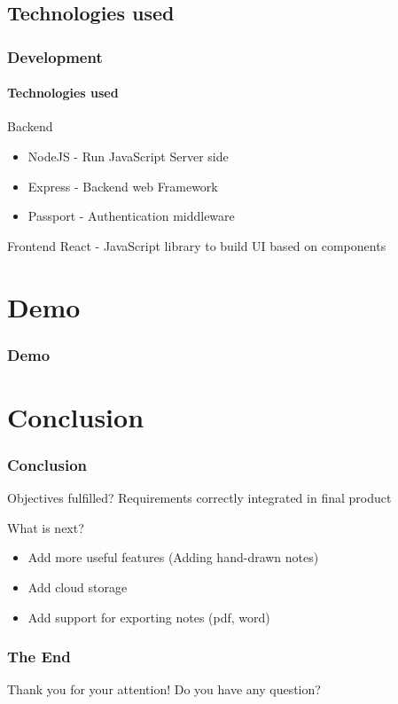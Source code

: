 \documentclass{beamer}
\begin{document}
	\subsection{Technologies used}
	\begin{frame}
		\frametitle{Development}
		\framesubtitle{Technologies used}
		\begin{alertblock}{Backend}
			\begin{itemize}
				\item NodeJS - Run JavaScript Server side
				\item Express - Backend web Framework
				\item Passport - Authentication middleware
			\end{itemize}
		\end{alertblock}
		
		\begin{alertblock}{Frontend}
			React - JavaScript library to build UI based on components
		\end{alertblock}
	\end{frame}
	
	\section{Demo}
	\begin{frame}
		\frametitle{Demo}
	\end{frame}
	
	\section{Conclusion}
	\begin{frame}
		\frametitle{Conclusion}
		
		\begin{alertblock}{Objectives fulfilled?}
			Requirements correctly integrated in final product
		\end{alertblock}
		
		\begin{alertblock}{What is next?}
			\begin{itemize}
				\item Add more useful features (Adding hand-drawn notes)
				\item Add cloud storage
				\item Add support for exporting notes (pdf, word)
			\end{itemize}
		\end{alertblock}
	\end{frame}
	
	\begin{frame}
		\frametitle{The End}
		
		\centering
		Thank you for your attention!
		\linebreak
		Do you have any question?
	\end{frame}
\end{document}
